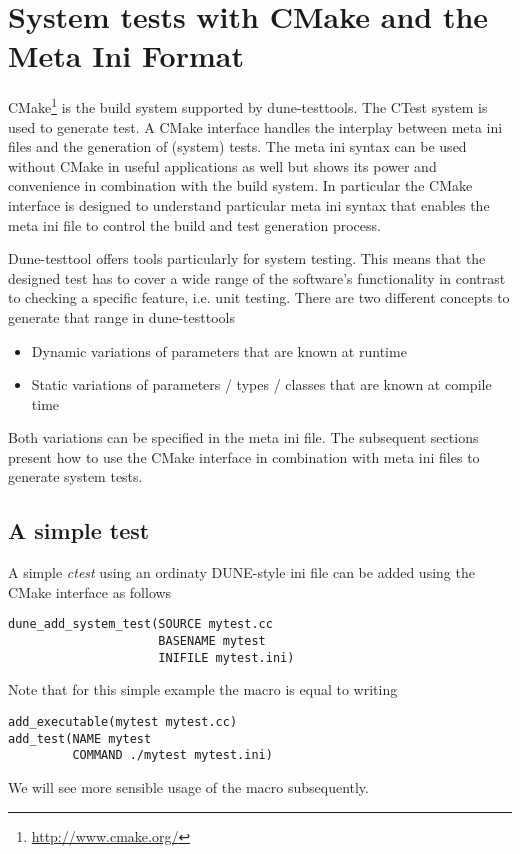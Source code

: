\documentclass[11pt]{article}
\begin{document}
\section{System tests with CMake and the Meta Ini Format}
\label{sec:systemtest}
CMake\footnote{\url{http://www.cmake.org/}} is the build system supported by dune-testtools. The CTest system is used to generate test.
A CMake interface handles the interplay between
meta ini files and the generation of (system) tests. The meta ini syntax can be used without CMake in useful applications as well but
shows its power and convenience in combination with the build system. In particular the CMake interface is designed to understand particular
meta ini syntax that enables the meta ini file to control the build and test generation process.

Dune-testtool offers tools particularly for system testing. This means that the designed test has to cover a wide range of the
software's functionality in contrast to checking a specific feature, i.e. unit testing. There are two different concepts to
generate that range in dune-testtools
\begin{itemize}
 \item Dynamic variations of parameters that are known at runtime
 \item Static variations of parameters / types / classes that are known at compile time
\end{itemize}
Both variations can be specified in the meta ini file.
The subsequent sections present how to use the CMake interface in combination with meta ini files to generate system tests.

\subsection{A simple test}
A simple \emph{ctest} using an ordinaty DUNE-style ini file can be added using the CMake interface as follows
\begin{lstlisting}[caption={A CMakeLists.txt adding a simple test with the dune-testtools CMake interface function \lstinline!dune_add_system_test!}]
dune_add_system_test(SOURCE mytest.cc
                     BASENAME mytest
                     INIFILE mytest.ini)
\end{lstlisting}

Note that for this simple example the macro is equal to writing
\begin{lstlisting}[caption={A CMakeLists.txt adding a simple test with the standard CMake macros}]
add_executable(mytest mytest.cc)
add_test(NAME mytest
         COMMAND ./mytest mytest.ini)
\end{lstlisting}
We will see more sensible usage of the macro subsequently.
\end{document}
